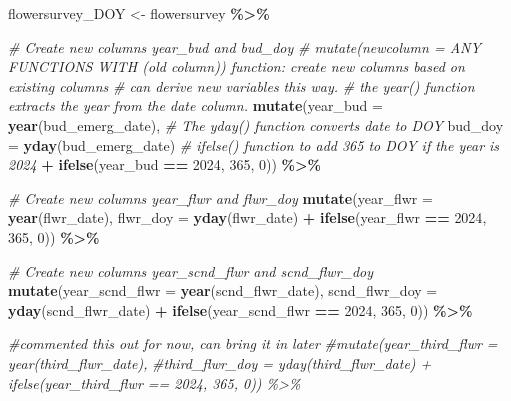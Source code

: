 \documentclass[
]{article}
\newenvironment{Shaded}{\begin{snugshade}}{\end{snugshade}}
\newcommand{\AttributeTok}[1]{\textcolor[rgb]{0.13,0.29,0.53}{#1}}
\newcommand{\CommentTok}[1]{\textcolor[rgb]{0.56,0.35,0.01}{\textit{#1}}}
\newcommand{\DecValTok}[1]{\textcolor[rgb]{0.00,0.00,0.81}{#1}}
\newcommand{\FunctionTok}[1]{\textcolor[rgb]{0.13,0.29,0.53}{\textbf{#1}}}
\newcommand{\NormalTok}[1]{#1}
\newcommand{\OtherTok}[1]{\textcolor[rgb]{0.56,0.35,0.01}{#1}}
\newcommand{\SpecialCharTok}[1]{\textcolor[rgb]{0.81,0.36,0.00}{\textbf{#1}}}
\begin{document}
\begin{Shaded}
\begin{Highlighting}[]
\NormalTok{flowersurvey\_DOY }\OtherTok{\textless{}{-}}\NormalTok{ flowersurvey }\SpecialCharTok{\%\textgreater{}\%}

\CommentTok{\# Create new columns \textquotesingle{}year\_bud\textquotesingle{} and \textquotesingle{}bud\_doy\textquotesingle{}}
  \CommentTok{\# mutate(newcolumn = ANY FUNCTIONS WITH (old column)) function: create new columns based on existing columns}
  \CommentTok{\# can derive new variables this way.}
\CommentTok{\# the year() function extracts the year from the date column.}
  \FunctionTok{mutate}\NormalTok{(}\AttributeTok{year\_bud =} \FunctionTok{year}\NormalTok{(bud\_emerg\_date),}
         \CommentTok{\# The yday() function converts date to DOY}
         \AttributeTok{bud\_doy =} \FunctionTok{yday}\NormalTok{(bud\_emerg\_date)}
         \CommentTok{\# ifelse() function to add 365 to DOY if the year is 2024}
         \SpecialCharTok{+} \FunctionTok{ifelse}\NormalTok{(year\_bud }\SpecialCharTok{==} \DecValTok{2024}\NormalTok{, }\DecValTok{365}\NormalTok{, }\DecValTok{0}\NormalTok{)) }\SpecialCharTok{\%\textgreater{}\%}
  
\CommentTok{\# Create new columns \textquotesingle{}year\_flwr\textquotesingle{} and \textquotesingle{}flwr\_doy\textquotesingle{}}
  \FunctionTok{mutate}\NormalTok{(}\AttributeTok{year\_flwr =} \FunctionTok{year}\NormalTok{(flwr\_date),}
         \AttributeTok{flwr\_doy =} \FunctionTok{yday}\NormalTok{(flwr\_date) }\SpecialCharTok{+} \FunctionTok{ifelse}\NormalTok{(year\_flwr }\SpecialCharTok{==} \DecValTok{2024}\NormalTok{, }\DecValTok{365}\NormalTok{, }\DecValTok{0}\NormalTok{)) }\SpecialCharTok{\%\textgreater{}\%}
  
\CommentTok{\# Create new columns \textquotesingle{}year\_scnd\_flwr\textquotesingle{} and \textquotesingle{}scnd\_flwr\_doy\textquotesingle{}}
  \FunctionTok{mutate}\NormalTok{(}\AttributeTok{year\_scnd\_flwr =} \FunctionTok{year}\NormalTok{(scnd\_flwr\_date),}
         \AttributeTok{scnd\_flwr\_doy =} \FunctionTok{yday}\NormalTok{(scnd\_flwr\_date) }\SpecialCharTok{+} \FunctionTok{ifelse}\NormalTok{(year\_scnd\_flwr }\SpecialCharTok{==} \DecValTok{2024}\NormalTok{, }\DecValTok{365}\NormalTok{, }\DecValTok{0}\NormalTok{)) }\SpecialCharTok{\%\textgreater{}\%}
  
\CommentTok{\#commented this out for now, can bring it in later}
  \CommentTok{\#mutate(year\_third\_flwr = year(third\_flwr\_date),}
         \CommentTok{\#third\_flwr\_doy = yday(third\_flwr\_date) + ifelse(year\_third\_flwr == 2024, 365, 0)) \%\textgreater{}\%}


\end{Highlighting}
\end{Shaded}
\end{document}
